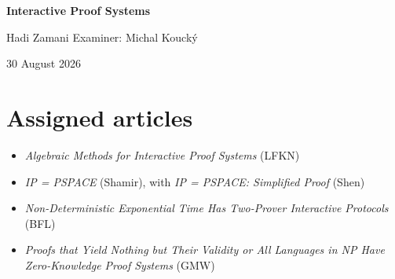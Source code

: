 \documentclass[10pt]{article}
\begin{document}
\begin{center}
{\LARGE\bfseries Interactive Proof Systems\par}
\vspace{1mm}
{Hadi Zamani \qquad Examiner: Michal Kouck\'y\par}
{\small 30 August 2026}
\end{center}

\section*{Assigned articles}
\begin{itemize}
\item \emph{Algebraic Methods for Interactive Proof Systems} (LFKN)
\item \emph{IP = PSPACE} (Shamir), with \emph{IP = PSPACE: Simplified Proof} (Shen)
\item \emph{Non-Deterministic Exponential Time Has Two-Prover Interactive Protocols} (BFL)
\item \emph{Proofs that Yield Nothing but Their Validity or All Languages in NP
Have Zero-Knowledge Proof Systems} (GMW)
\end{itemize}
\end{document}

